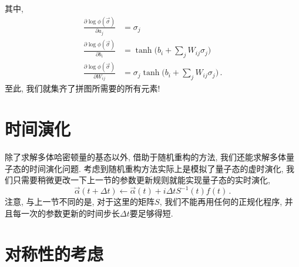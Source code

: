 \documentclass[10pt]{article}
\begin{document}
其中,
\begin{align}
\frac{\partial\log\phi(\vec{\sigma})}{\partial a_{j}} & = \sigma_{j} \nonumber \\
\frac{\partial\log\phi(\vec{\sigma})}{\partial b_{i}} & = \tanh{\Big(b_{i}+\sum_{j}W_{ij}\sigma_{j}\Big)} \nonumber \\
\frac{\partial\log\phi(\vec{\sigma})}{\partial W_{ij}} & = \sigma_{j} \tanh{\Big(b_{i}+\sum_{j}W_{ij}\sigma_{j}\Big)}\,.
\end{align}
至此, 我们就集齐了拼图所需要的所有元素!


\section{时间演化}

除了求解多体哈密顿量的基态以外, 借助于随机重构的方法, 我们还能求解多体量子态的时间演化问题. 
考虑到随机重构方法实际上是模拟了量子态的虚时演化, 我们只需要稍微更改一下上一节的参数更新规则就能实现量子态的实时演化, 
\begin{equation}
\vec{\alpha}(t+\Delta{t}) \leftarrow \vec{\alpha}(t) + i \Delta{t} S^{-1}(t)f(t)\,.
\end{equation}
注意, 与上一节不同的是, 对于这里的矩阵$S$, 我们不能再用任何的正规化程序, 并且每一次的参数更新的时间步长$\Delta{t}$要足够得短. 


\section{对称性的考虑}
\end{document}
